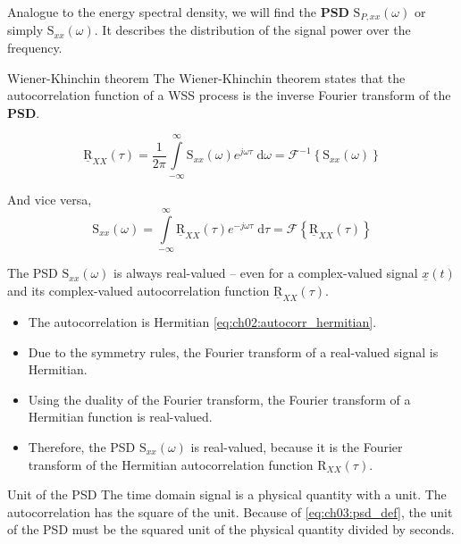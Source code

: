 \begin{refsection}
Analogue to the energy spectral density, we will find the  \textbf{\ac{PSD}} $\mathrm{S}_{P,xx}(\omega)$ or simply $\mathrm{S}_{xx}(\omega)$. It describes the distribution of the signal power over the frequency. 

\begin{definition}{Wiener-Khinchin theorem}
	The  Wiener-Khinchin theorem states that the autocorrelation function of a \ac{WSS} process is the inverse Fourier transform of the  \textbf{\ac{PSD}}.
	
	\begin{equation}
		\underline{\mathrm{R}}_{XX}(\tau) = \frac{1}{2 \pi} \int\limits_{-\infty}^{\infty} \mathrm{S}_{xx}(\omega) e^{j \omega \tau} \; \mathrm{d} \omega = \mathcal{F}^{-1} \left\{\mathrm{S}_{xx}(\omega)\right\}
	\end{equation}
	
	And vice versa,
	\begin{equation}
		\mathrm{S}_{xx}(\omega) = \int\limits_{-\infty}^{\infty} \underline{\mathrm{R}}_{XX}(\tau) e^{-j \omega \tau} \; \mathrm{d} \tau = \mathcal{F}\left\{\underline{\mathrm{R}}_{XX}(\tau)\right\}
		\label{eq:ch03:psd_def}
	\end{equation}
\end{definition}

The \ac{PSD} $\mathrm{S}_{xx}(\omega)$ is always real-valued -- even for a complex-valued signal $\underline{x}(t)$ and its complex-valued autocorrelation function $\underline{\mathrm{R}}_{XX}(\tau)$.
\begin{itemize}
	\item The autocorrelation is Hermitian \eqref{eq:ch02:autocorr_hermitian}.
	\item Due to the symmetry rules, the Fourier transform of a real-valued signal is Hermitian.
	\item Using the duality of the Fourier transform, the Fourier transform of a Hermitian function is real-valued.
	\item Therefore, the \ac{PSD} $\mathrm{S}_{xx}(\omega)$ is real-valued, because it is the Fourier transform of the Hermitian autocorrelation function $\mathrm{R}_{XX}(\tau)$.
\end{itemize}

\begin{excursus}{Unit of the \ac{PSD}}
	The time domain signal is a physical quantity with a unit. The autocorrelation has the square of the unit. Because of \eqref{eq:ch03:psd_def}, the unit of the \ac{PSD} must be the squared unit of the physical quantity divided by seconds.
	

\end{excursus}
\end{refsection}
